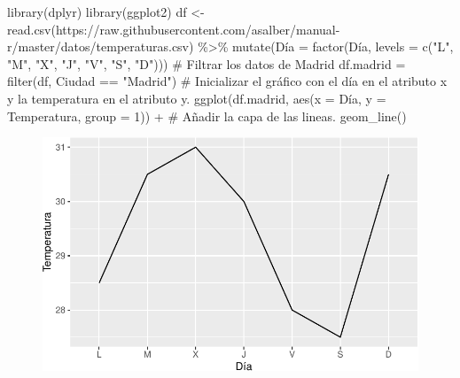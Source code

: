 \documentclass[
  a4paper,
]{scrreport}
\newenvironment{Shaded}{\begin{snugshade}}{\end{snugshade}}
\newcommand{\AttributeTok}[1]{\textcolor[rgb]{0.40,0.45,0.13}{#1}}
\newcommand{\CommentTok}[1]{\textcolor[rgb]{0.37,0.37,0.37}{#1}}
\newcommand{\DecValTok}[1]{\textcolor[rgb]{0.68,0.00,0.00}{#1}}
\newcommand{\FunctionTok}[1]{\textcolor[rgb]{0.28,0.35,0.67}{#1}}
\newcommand{\NormalTok}[1]{\textcolor[rgb]{0.00,0.23,0.31}{#1}}
\newcommand{\OtherTok}[1]{\textcolor[rgb]{0.00,0.23,0.31}{#1}}
\newcommand{\SpecialCharTok}[1]{\textcolor[rgb]{0.37,0.37,0.37}{#1}}
\newcommand{\StringTok}[1]{\textcolor[rgb]{0.13,0.47,0.30}{#1}}
\theoremstyle{definition}
\theoremstyle{definition}
\theoremstyle{remark}
\begin{document}
\begin{Shaded}
\begin{Highlighting}[]
\FunctionTok{library}\NormalTok{(dplyr)}
\FunctionTok{library}\NormalTok{(ggplot2)}
\NormalTok{df }\OtherTok{\textless{}{-}} \FunctionTok{read.csv}\NormalTok{(}\StringTok{\textquotesingle{}https://raw.githubusercontent.com/asalber/manual{-}r/master/datos/temperaturas.csv\textquotesingle{}}\NormalTok{) }\SpecialCharTok{\%\textgreater{}\%}
    \FunctionTok{mutate}\NormalTok{(Día }\OtherTok{=} \FunctionTok{factor}\NormalTok{(Día, }\AttributeTok{levels =} \FunctionTok{c}\NormalTok{(}\StringTok{"L"}\NormalTok{, }\StringTok{"M"}\NormalTok{, }\StringTok{"X"}\NormalTok{, }\StringTok{"J"}\NormalTok{, }\StringTok{"V"}\NormalTok{, }\StringTok{"S"}\NormalTok{, }\StringTok{"D"}\NormalTok{)))}
\CommentTok{\# Filtrar los datos de Madrid}
\NormalTok{df.madrid }\OtherTok{=} \FunctionTok{filter}\NormalTok{(df, Ciudad }\SpecialCharTok{==} \StringTok{"Madrid"}\NormalTok{)}
\CommentTok{\# Inicializar el gráfico con el día en el atributo x y la temperatura en el atributo y. }
\FunctionTok{ggplot}\NormalTok{(df.madrid, }\FunctionTok{aes}\NormalTok{(}\AttributeTok{x =}\NormalTok{ Día, }\AttributeTok{y =}\NormalTok{ Temperatura, }\AttributeTok{group =} \DecValTok{1}\NormalTok{)) }\SpecialCharTok{+}
\CommentTok{\# Añadir la capa de las lineas.}
    \FunctionTok{geom\_line}\NormalTok{()}
\end{Highlighting}
\end{Shaded}

\begin{figure}[H]

{\centering \includegraphics{./07-graficos_files/figure-pdf/unnamed-chunk-6-1.pdf}

}

\end{figure}
\end{document}
